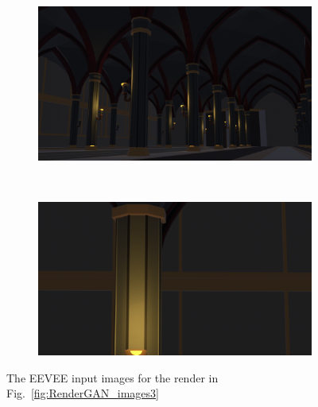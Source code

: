 \begin{figure}[h!]
    \centering
    \begin{subfigure}[b]{0.9\textwidth}
     \includegraphics[width=\textwidth]{figures/result/eevee/s1_camera_95_eevee.png}
     \caption{}
    \end{subfigure}
    \\ \vspace{0.2cm}
    \begin{subfigure}[b]{0.9\textwidth}
     \includegraphics[width=\textwidth]{figures/result/eevee/s1_camera_2_eevee.png}
     \caption{}
    \end{subfigure}
    \caption[EEVEE Example of input]{The EEVEE input images for the render in Fig.~\ref{fig:RenderGAN_images3}}
    \label{fig:eevee_images3}
\end{figure}

